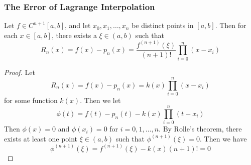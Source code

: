 \documentclass{matharticle}
\begin{document}
\subsubsection{The Error of Lagrange Interpolation}
\begin{theorem}
	Let $f \in C^{n+1}[a, b]$, and let $x_0, x_1, \ldots, x_n$ be distinct points in $[a, b]$. Then for each $x \in [a, b]$, there exists a $\xi \in (a, b)$ such that
	\begin{equation}
		R_n(x) = f(x) - p_n(x) = \frac{f^{(n+1)}(\xi)}{(n+1)!} \prod_{i=0}^{n} (x - x_i)
	\end{equation}
\end{theorem}
\begin{proof}
	Let
	\begin{equation}
		R_n(x) = f(x) - p_n(x) = k(x) \prod_{i=0}^{n} (x - x_i)
	\end{equation}
	for some function $k(x)$. Then we let
	\begin{equation}
		\phi(t) = f(t) - p_n(t) - k(x) \prod_{i=0}^{n} (t - x_i)
	\end{equation}
	Then $\phi(x) = 0$ and $\phi(x_i) = 0$ for $i = 0, 1, \ldots, n$. By Rolle's theorem, there exists at least one point $\xi \in (a, b)$ such that $\phi^{(n+1)}(\xi) = 0$. Then we have
	\begin{equation}
		\phi^{(n+1)}(\xi) = f^{(n+1)}(\xi) - k(x) (n+1)! = 0
	\end{equation}
\end{proof}
\end{document}

